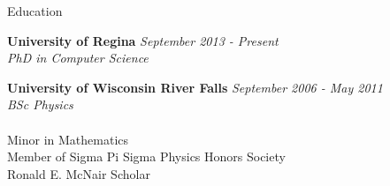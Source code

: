 \documentclass{resume} %
\begin{document}
{\centerline {}}

\begin{rSection}{Education}

{\bf University of Regina} \hfill {\em September 2013 - Present} 
\\{ \textit {PhD in Computer Science }} 

{\bf University of Wisconsin River Falls} \hfill {\em September 2006 - May 2011} 
\\ { \textit {BSc Physics}} \hfill \\ \\
\small Minor in Mathematics \smallskip \\
\small Member of Sigma Pi Sigma Physics Honors Society \\
\small Ronald E. McNair Scholar

\end{rSection}
\end{document}
